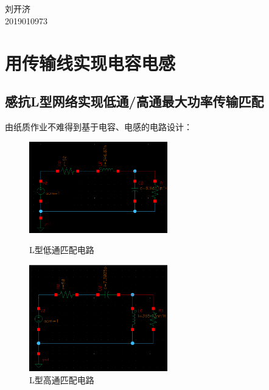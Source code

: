 \documentclass[12pt, a4paper]{article}
\begin{document}
	\begin{center}
		\vspace{0.2in}
		 \\ [12pt]
		  \\ [12pt]
		{\fontsize{14pt}{1.2em}\selectfont
			刘开济\\ [10pt]
			2019010973 \\ [10pt]
		}
	\end{center}
    \section{用传输线实现电容电感}
    \subsection{感抗L型网络实现低通/高通最大功率传输匹配}
    由纸质作业不难得到基于电容、电感的电路设计：
    \begin{figure}[htbp]
    	\centering
    	\begin{minipage}[t]{0.48\textwidth}
    		\centering
    		\includegraphics[width=6cm]{L-LP-STD-circuit}
    		\caption{L型低通匹配电路}
    		\label{fig1.1}
    	\end{minipage}
    	\begin{minipage}[t]{0.48\textwidth}
    		\centering
    		\includegraphics[width=6cm]{L-HP-STD-circuit}
    		\caption{L型高通匹配电路}
    	\end{minipage}
    \end{figure}\par
\end{document}
